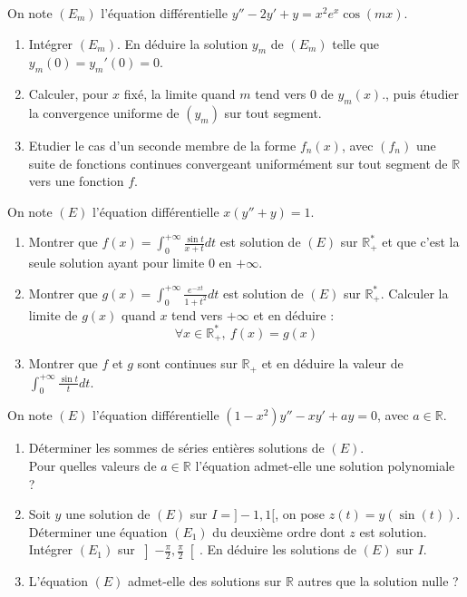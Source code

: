 \documentclass[french,a4paper]{article}
\newcommand{\R}{\mathbb{R}}
\newcommand{\st}{^*}
\theoremstyle{plain}
\theoremstyle{definition}
\theoremstyle{remark}
\begin{document}
\begin{ex}[Moulin.ED.14]{}
	On note $(E_m)$ l'équation différentielle $y''-2y'+y=x^2e^x\cos(mx)$.
	\begin{enumerate}
		\item Intégrer $(E_m)$. En déduire la solution $y_m$ de $(E_m)$ telle que $y_m(0)=y_m'(0)=0$.
		\item Calculer, pour $x$ fixé, la limite quand $m$ tend vers $0$ de $y_m(x)$., puis étudier la convergence uniforme de $(y_m)$ sur tout segment.
		\item Etudier le cas d'un seconde membre de la forme $f_n(x)$, avec $(f_n)$ une suite de fonctions continues convergeant uniformément sur tout segment de $\R$ vers une fonction $f$.
	\end{enumerate}
\end{ex}

\begin{ex}[Moulin.ED.15]{}
	On note $(E)$ l'équation différentielle $x(y''+y)=1$.
	\begin{enumerate}
		\item Montrer que $f(x)=\displaystyle\int_{0}^{+\infty}\frac{\sin t}{x+t}dt$ est solution de $(E)$ sur $\R_+\st$ et que c'est la seule solution ayant pour limite $0$ en $+\infty$.
		\item Montrer que $g(x)=\displaystyle\int_{0}^{+\infty}\frac{e^{-xt}}{1+t^2}dt$ est solution de $(E)$ sur $\R_+\st$. Calculer la limite de $g(x)$ quand $x$ tend vers $+\infty$ et en déduire : $$\forall x\in\R_+\st,\ f(x)=g(x)$$
		\item Montrer que $f$ et $g$ sont continues sur $\R_+$ et en déduire la valeur de $\displaystyle\int_{0}^{+\infty}\frac{\sin t}{t}dt$.
	\end{enumerate}
\end{ex}

\begin{ex}[Moulin.ED.16]{}
	On note $(E)$ l'équation différentielle $(1-x^2)y''-xy'+ay=0$, avec $a\in\R$.
	\begin{enumerate}
		\item Déterminer les sommes de séries entières solutions de $(E)$. \\ Pour quelles valeurs de $a\in\R$ l'équation admet-elle une solution polynomiale ?
		\item Soit $y$ une solution de $(E)$ sur $I=]-1,1[$, on pose $z(t)=y(\sin(t))$. \\ Déterminer une équation $(E_1)$ du deuxième ordre dont $z$ est solution. Intégrer $(E_1)$ sur $\displaystyle\left]-\frac{\pi}{2},\frac{\pi}{2}\right[$. En déduire les solutions de $(E)$ sur $I$.
		\item L'équation $(E)$ admet-elle des solutions sur $\R$ autres que la solution nulle ?
	\end{enumerate}
\end{ex}
\end{document}
